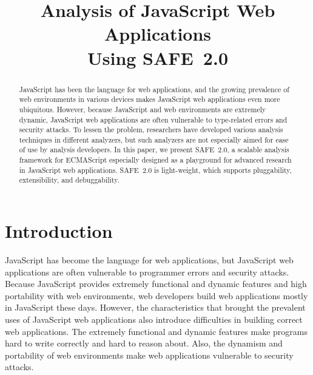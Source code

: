 \documentclass[10pt, conference]{IEEEtran}
\newcommand{\safe}{{SAFE~2.0}\xspace}
\begin{document}
\title{\hspace*{-.7em}
Analysis of JavaScript Web Applications\\ Using \safe}

\author{
\and
{}
\and
{}
\and
{}
}
\maketitle


\begin{abstract}
JavaScript has been the language for web applications, and
the growing prevalence of web environments in various devices
makes JavaScript web applications even more ubiquitous.
However, because JavaScript and web environments are
extremely dynamic, JavaScript web applications are often
vulnerable to type-related errors and security attacks.
To lessen the problem, researchers have developed various analysis
techniques in different analyzers, but such analyzers are not especially
aimed for ease of use by analysis developers.  In this paper, we present \safe, a scalable
analysis framework for ECMAScript especially designed as a playground
for advanced research in JavaScript web applications.  \safe is
light-weight, which supports pluggability, extensibility, and
debuggability.
\end{abstract}


\section{Introduction}
JavaScript has become the language for web applications, but
JavaScript web applications are often vulnerable to programmer
errors and security attacks.  Because JavaScript provides
extremely functional and dynamic features and high portability
with web environments, web developers build web applications
mostly in JavaScript these days.  However, the characteristics
that brought the prevalent uses of JavaScript web applications
also introduce difficulties in building correct web applications.
The extremely functional and dynamic features make programs
hard to write correctly and hard to reason about.
Also, the dynamism and portability of web environments make
web applications vulnerable to security attacks.
\end{document}
